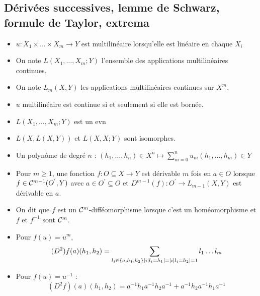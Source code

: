 \documentclass{cours}
\begin{document}
\subsection{Dérivées successives, lemme de Schwarz, formule de Taylor, extrema}
\begin{definition}
    \begin{itemize}
        \item $u : X_{1} \times \ldots \times X_{m} \rightarrow Y$ est multilinéaire lorsqu'elle est linéaire en chaque $X_{i}$
        \item On note $L(X_{1}, \ldots, X_{m}; Y)$ l'ensemble des applications multilinéaires continues.
        \item On note $L_{m}(X, Y)$ les applications multilinéaires continues sur $X^{m}$.
    \end{itemize}
\end{definition}

\begin{remark}
    \begin{itemize}
        \item $u$ multilinéaire est continue si et seulement si elle est bornée.
        \item $L(X_{1}, \ldots, X_{m}; Y)$ est un evn
        \item $L(X, L(X, Y))$ et $L(X, X; Y)$ sont isomorphes.
        \item Un polynôme de degré $n$ : $(h_{1}, \ldots, h_{n}) \in X^{n} \mapsto \sum_{m = 0}^{n} u_{m}(h_{1}, \ldots, h_{m}) \in Y$
    \end{itemize}
\end{remark}

\begin{definition}
    \begin{itemize}
        \item Pour $m \geq 1$, une fonction $f : O\subseteq X \rightarrow Y$ est dérivable $m$ fois en $a \in O$ lorsque $f \in \mathcal{C}^{m - 1}(O^{'}, Y)$ avec $a \in O^{'} \subseteq O$ et $D^{m - 1}(f) : O^{'} \rightarrow L_{m - 1}(X, Y)$ est dérivable en $a$.
        \item On dit que $f$ est un $\mathcal{C}^{m}$-difféomorphisme lorsque c'est un homéomorphisme et $f$ et $f^{-1}$ sont $\mathcal{C}^{m}$.
    \end{itemize}
\end{definition}

\begin{proposition}
    \begin{itemize}
        \item Pour $f(u) = u^{m}$,
              \[
                  (D^{2})f(a)(h_{1}, h_{2}) = \sum_{l_{i} \in \left\{a, h_{1}, h_{2}\right\}\\ \left|i \mid l_{i} = h_{1}\right| = \left|i \mid l_{i} = h_{2}\right| = 1} l_{1}\ldots l_{m}
              \]
        \item Pour $f(u) = u^{-1}$ :
              \[
                  (D^{2}f)(a)(h_{1}, h_{2}) = a^{-1}h_{1}a^{-1}h_{2}a^{-1} + a^{-1}h_{2}a^{-1}h_{1}a^{-1}
              \]
    \end{itemize}
\end{proposition}
\end{document}
